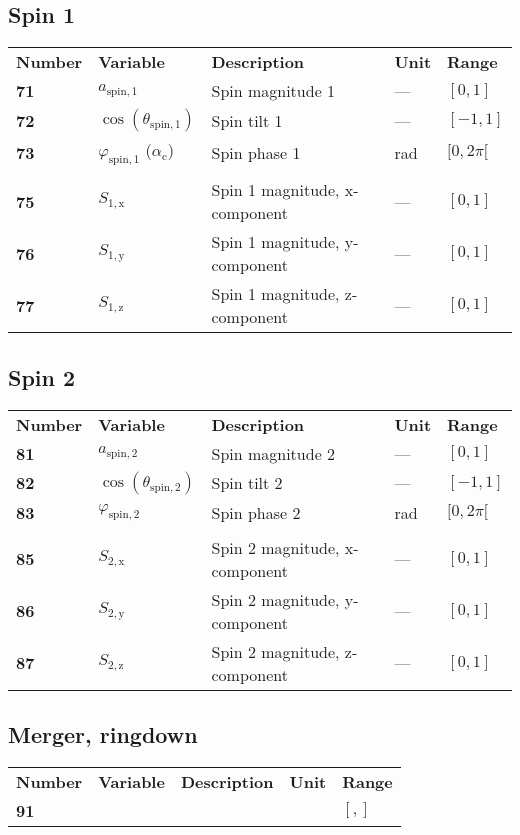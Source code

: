 \documentclass[10pt]{article}
\begin{document}
\subsection{Spin 1}
\begin{tabular}{lllll}
  \textbf{Number} & \textbf{Variable} & \textbf{Description} & \textbf{Unit} & \textbf{Range} \\
  \textbf{71} & $a_\mathrm{spin,1}$  & Spin magnitude 1 & --- & $[0,1]$ \\
  \textbf{72} & $\cos(\theta_\mathrm{spin,1})$  & Spin tilt 1 & --- & $[-1,1]$ \\
  \textbf{73} & $\varphi_\mathrm{spin,1}$  ($\alpha_\mathrm{c}$)  & Spin phase 1 & rad & $[0,2\pi[$ \\
      & & & & \\
  \textbf{75} & $S_\mathrm{1,x}$  & Spin 1 magnitude, x-component & --- & $[0,1]$ \\
  \textbf{76} & $S_\mathrm{1,y}$  & Spin 1 magnitude, y-component & --- & $[0,1]$ \\
  \textbf{77} & $S_\mathrm{1,z}$  & Spin 1 magnitude, z-component & --- & $[0,1]$ \\
\end{tabular}

\subsection{Spin 2}
\begin{tabular}{lllll}
  \textbf{Number} & \textbf{Variable} & \textbf{Description} & \textbf{Unit} & \textbf{Range} \\
  \textbf{81} & $a_\mathrm{spin,2}$  & Spin magnitude 2 & --- & $[0,1]$ \\
  \textbf{82} & $\cos(\theta_\mathrm{spin,2})$  & Spin tilt 2 & --- & $[-1,1]$ \\
  \textbf{83} & $\varphi_\mathrm{spin,2}$  & Spin phase 2 & rad & $[0,2\pi[$ \\
      & & & & \\
  \textbf{85} & $S_\mathrm{2,x}$  & Spin 2 magnitude, x-component & --- & $[0,1]$ \\
  \textbf{86} & $S_\mathrm{2,y}$  & Spin 2 magnitude, y-component & --- & $[0,1]$ \\
  \textbf{87} & $S_\mathrm{2,z}$  & Spin 2 magnitude, z-component & --- & $[0,1]$ \\
\end{tabular}

\subsection{Merger, ringdown}
\begin{tabular}{lllll}
  \textbf{Number} & \textbf{Variable} & \textbf{Description} & \textbf{Unit} & \textbf{Range} \\
  \textbf{91} &   & & & $[,]$ \\
\end{tabular}
\end{document}
